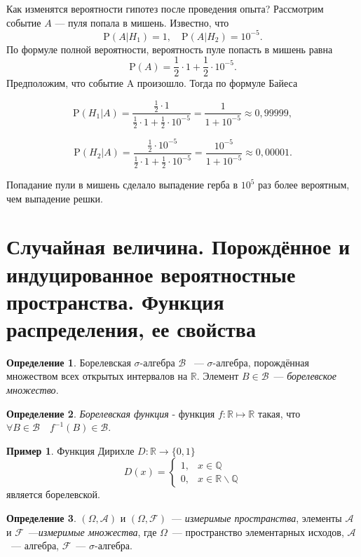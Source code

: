 \documentclass[oneside,final,14pt]{extreport}
\theoremstyle{definition}
\newtheorem{defn}{Определение}[section]
\newtheorem*{exmp}{Пример}
\begin{document}
Как изменятся вероятности гипотез после проведения опыта? Рассмотрим
событие $A$ — пуля попала в мишень. Известно, что
$$\mathrm{P}\left(A | H_{1}\right)=1, \quad \mathrm{P}\left(A | H_{2}\right)=10^{-5}.$$
По формуле полной вероятности, вероятность пуле попасть в мишень равна
$$\mathrm{P}(A)=\frac{1}{2} \cdot 1+\frac{1}{2} \cdot 10^{-5}.$$
Предположим, что событие A произошло. Тогда по формуле Байеса

$$\mathrm{P}\left(H_{1} | A\right)=\frac{\frac{1}{2} \cdot 1}{\frac{1}{2} \cdot 1+\frac{1}{2} \cdot 10^{-5}}=\frac{1}{1+10^{-5}} \approx 0,99999,$$

$$\mathrm{P}\left(H_{2} | A\right)=\frac{\frac{1}{2} \cdot 10^{-5}}{\frac{1}{2} \cdot 1+\frac{1}{2} \cdot 10^{-5}}=\frac{10^{-5}}{1+10^{-5}} \approx 0,00001.$$

Попадание пули в мишень сделало выпадение герба в $10^5$ раз более вероятным, чем выпадение решки.

\section{Случайная величина. Порождённое и индуцированное вероятностные пространства. Функция распределения, ее свойства}

\begin{defn}
    {\it \( \text{Борелевская~} \sigma \text{-алгебра~} \mathcal{B} \) }~--- \( \sigma \text{-алгебра}\), порождённая множеством всех открытых интервалов на $\mathbb{R}$. Элемент \(B \in \mathcal{B}\)~--- {\it борелевское множество}.
\end{defn}


\begin{defn}
    {\it Борелевская функция} - функция $f: \mathbb{R} \mapsto \mathbb{R}$ такая, что $\forall B \in \mathcal{B} \quad f^{-1}(B) \in \mathcal{B}$.
\end{defn}

\begin{exmp}
    Функция Дирихле $D: \mathbb{R} \rightarrow\{0,1\}$
    \begin{equation*}
        D(x)=\left\{\begin{array}{ll}
        1, & x \in \mathbb{Q} \\
        0, & x \in \mathbb{R} \backslash \mathbb{Q}
        \end{array}\right.
    \end{equation*}
является борелевской. 
\end{exmp}

\begin{defn}
    \( (\Omega, \mathcal{A}) \) и \( (\Omega, \mathcal{F}) \)~--- {\it измеримые пространства}, элементы \(\mathcal{A}\) и \(\mathcal{F}\)~---{\it измеримые множества}, где $\Omega$~--- пространство элементарных исходов, $\mathcal{A}$~--- алгебра, $\mathcal{F}$~--- $\sigma$-алгебра.
\end{defn}
\end{document}
